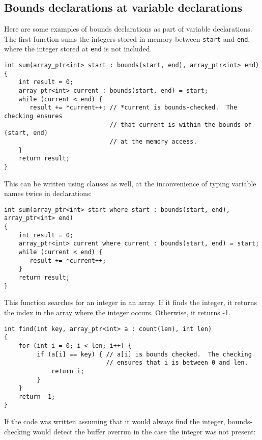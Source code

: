 \subsection{Bounds declarations at variable declarations}
\label{section:variable-declarations}

Here are some examples of bounds declarations as part of variable
declarations. The first function sums the integers stored in memory
between \texttt{start} and \texttt{end}, where the integer stored at
\texttt{end} is not included.

\begin{lstlisting}
int sum(array_ptr<int> start : bounds(start, end), array_ptr<int> end)
{ 
    int result = 0;
    array_ptr<int> current : bounds(start, end) = start;
    while (current < end) {
       result += *current++; // *current is bounds-checked.  The checking ensures 
                             // that current is within the bounds of (start, end) 
                             // at the memory access.                           
    }
    return result;
}
\end{lstlisting}

This can be written using  clauses as well, at the
inconvenience of typing variable names twice in declarations:

\begin{lstlisting}
int sum(array_ptr<int> start where start : bounds(start, end), array_ptr<int> end)
{ 
    int result = 0;
    array_ptr<int> current where current : bounds(start, end) = start;
    while (current < end) {
       result += *current++;                          
    }
    return result;
}
\end{lstlisting}

This function searches for an integer in an array. If it finds the
integer, it returns the index in the array where the integer occurs.
Otherwise, it returns -1.

\begin{lstlisting}
int find(int key, array_ptr<int> a : count(len), int len)
{
    for (int i = 0; i < len; i++) {
         if (a[i] == key) { // a[i] is bounds checked.  The checking
                            // ensures that i is between 0 and len.
             return i;
         }
    }
    return -1;
}
\end{lstlisting}

If the code was written assuming that it would always find the integer,
bounds-checking would detect the buffer overrun in the case the integer
was not present:

